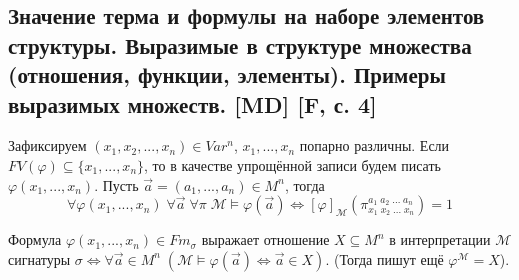 \documentclass[a4paper, fleqn]{article}
\begin{document}
    \subsection{Значение терма и формулы на наборе элементов структуры. Выразимые в структуре множества (отношения, функции, элементы). Примеры выразимых множеств. [MD] [F, с. 4]}
    \begin{proposition}
        Зафиксируем $(x_1, x_2, ..., x_n) \in Var^n$, $x_1, ..., x_n$ попарно различны. Если $FV(\varphi) \subseteq \{x_1, ..., x_n\}$, то в качестве упрощённой записи будем писать $\varphi(x_1, ..., x_n)$. Пусть $\overrightarrow{a} = (a_1, ..., a_n) \in M^n$, тогда
        $$\forall \varphi(x_1, ..., x_n) \; \forall \overrightarrow{a} \; \forall \mathcal{\pi} \; \mathcal{M} \vDash \varphi(\overrightarrow{a}) \Leftrightarrow [\varphi]_{\mathcal{M}} (\pi_{x_1 \; x_2 \; ... \; x_n}^{a_1 \; a_2 \; ... \; a_n}) = 1$$
    \end{proposition}

    \begin{definition}
        Формула $\varphi(x_1, ..., x_n) \in Fm_{\sigma}$ выражает отношение $X \subseteq M^n$ в интерпретации $\mathcal{M}$ сигнатуры $\sigma \Leftrightarrow \forall \overrightarrow{a} \in M^n \; (\mathcal{M} \vDash \varphi(\overrightarrow{a}) \Leftrightarrow \overrightarrow{a} \in X)$. (Тогда пишут ещё $\varphi^{\mathcal{M}} = X$).
    \end{definition}
\end{document}
